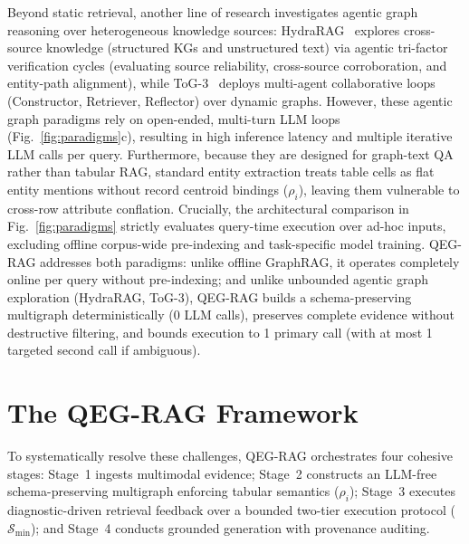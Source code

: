 \documentclass[runningheads]{llncs}
\begin{document}
Beyond static retrieval, another line of research investigates agentic graph reasoning over heterogeneous knowledge sources: HydraRAG~\cite{tan2025hydrarag} explores cross-source knowledge (structured KGs and unstructured text) via agentic tri-factor verification cycles (evaluating source reliability, cross-source corroboration, and entity-path alignment), while ToG-3~\cite{wu2025tog3} deploys multi-agent collaborative loops (Constructor, Retriever, Reflector) over dynamic graphs. However, these agentic graph paradigms rely on open-ended, multi-turn LLM loops (Fig.~\ref{fig:paradigms}c), resulting in high inference latency and multiple iterative LLM calls per query. Furthermore, because they are designed for graph-text QA rather than tabular RAG, standard entity extraction treats table cells as flat entity mentions without record centroid bindings ($\rho_i$), leaving them vulnerable to cross-row attribute conflation. Crucially, the architectural comparison in Fig.~\ref{fig:paradigms} strictly evaluates query-time execution over ad-hoc inputs, excluding offline corpus-wide pre-indexing and task-specific model training. QEG-RAG addresses both paradigms: unlike offline GraphRAG, it operates completely online per query without pre-indexing; and unlike unbounded agentic graph exploration (HydraRAG, ToG-3), QEG-RAG builds a schema-preserving multigraph deterministically (0 LLM calls), preserves complete evidence without destructive filtering, and bounds execution to 1 primary call (with at most 1 targeted second call if ambiguous).

\section{The QEG-RAG Framework}
\label{sec:method}



To systematically resolve these challenges, QEG-RAG orchestrates four cohesive stages: Stage~1 ingests multimodal evidence; Stage~2 constructs an LLM-free schema-preserving multigraph enforcing tabular semantics ($\rho_i$); Stage~3 executes diagnostic-driven retrieval feedback over a bounded two-tier execution protocol ($\mathcal{S}_{\min}$); and Stage~4 conducts grounded generation with provenance auditing.
\end{document}
